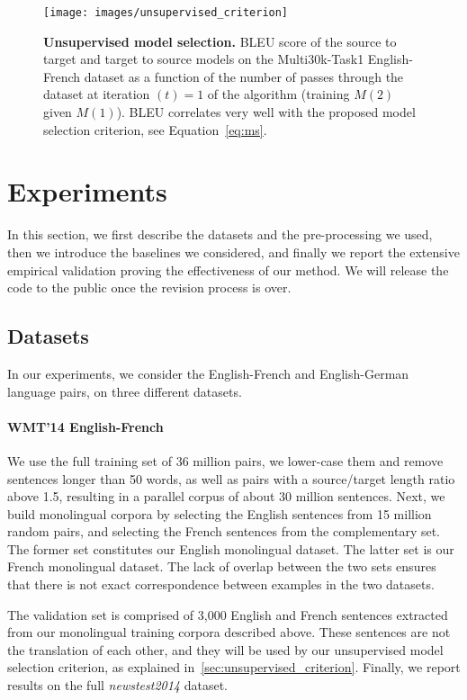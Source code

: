 \documentclass{article} \usepackage{iclr2018_conference,times}
\begin{document}
\begin{SCfigure}\centering
   \texttt{[image: images/unsupervised\_criterion]}
   \caption{\textbf{Unsupervised model selection.} BLEU score of the source to target and target to source models on the Multi30k-Task1 English-French dataset as a function of the number of passes through the dataset at iteration ${(t)}=1$ of the algorithm (training $M(2)$ given $M(1)$). BLEU correlates very well with the proposed model selection criterion, see Equation~\ref{eq:ms}.\label{fig:unsupervised_criterion}}
\end{SCfigure}

 \section{Experiments}
\label{sec:experiments}
In this section, we first describe the datasets and the pre-processing we used, then we introduce the baselines we considered, and finally we report the extensive empirical validation proving the effectiveness of our method. We will release the code to the public once the revision process is over. 
\subsection{Datasets}

In our experiments, we consider the English-French and English-German language pairs, on three different datasets.

\paragraph{WMT'14 English-French} We use the full training set of 36 million pairs, we lower-case them and remove sentences longer than 50 words, as well as pairs with a source/target length ratio above 1.5, resulting in a parallel corpus of about 30 million sentences. Next, we build monolingual corpora by selecting the English sentences from 15 million random pairs, and selecting the French sentences from the complementary set. The former set constitutes our English monolingual dataset. The latter set is our French monolingual dataset. The lack of overlap between the two sets ensures that there is not exact correspondence between examples in the two datasets.

The validation set is comprised of 3,000 English and French sentences extracted from our  monolingual training corpora described above. These sentences are not the translation of each other, and they will be used by our unsupervised model selection criterion, as explained in~\ref{sec:unsupervised_criterion}. Finally, we report results on the full \textit{newstest2014} dataset.
\end{document}
